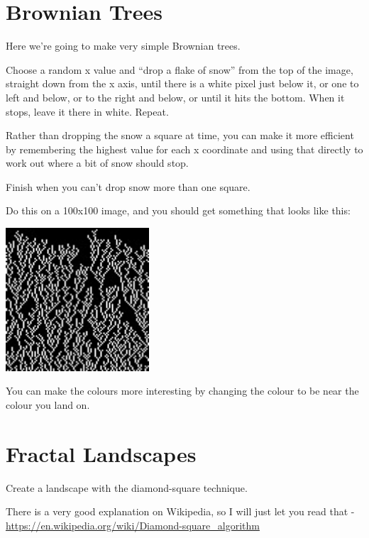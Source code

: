 \documentclass{article}
\begin{document}
    \section{Brownian Trees}
        Here we're going to make very simple Brownian trees.  
        
        Choose a random x value and ``drop a flake of snow'' from the top of the image, straight down from the x axis, until there is a
        white pixel just below it, or one to left and below, or to the right and below, or until it hits the bottom. When it stops, leave
        it there in white. Repeat.
        
        Rather than dropping the snow a square at time, you can make it more efficient by remembering the highest value for each x
        coordinate and using that directly to work out where a bit of snow should stop.
        
        Finish when you can't drop snow more than one square.
        
        Do this on a 100x100 image, and you should get something that looks like this:
        
        \begin{center}
            \includegraphics[width=0.4\textwidth]{snow}
        \end{center}
        

        You can make the colours more interesting by changing the colour to be near the colour you land on.        

    \section{Fractal Landscapes}
        Create a landscape with the diamond-square technique.  
        
        There is a very good explanation on Wikipedia, so I will just let you read that - 
        \url{https://en.wikipedia.org/wiki/Diamond-square_algorithm}
        
\end{document}

